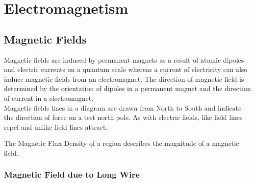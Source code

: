 \documentclass[../main]{subfiles}
\begin{document}
\section{Electromagnetism}

	\subsection{Magnetic Fields}


	Magnetic fields are induced by permanent magnets as a result of atomic dipoles and electric currents on a quantum scale whereas a current of electricity can also induce magnetic fields from an electromagnet. The direction of magnetic field is determined by the orientation of dipoles in a permanent magnet and the direction of current in a electromagnet. \\

	Magnetic fields lines in a diagram are drawn from North to South and indicate the direction of force on a test north pole. As with electric fields, like field lines repel and unlike field lines attract. \\



	The Magnetic Flux Density of a region describes the magnitude of a magnetic field. \\


	\subsubsection{Magnetic Field due to Long Wire}
\end{document}
